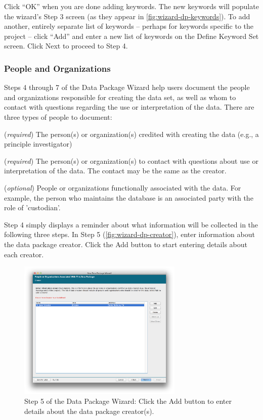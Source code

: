 Click ``OK'' when you are done adding keywords. The new keywords will
populate the wizard's Step 3 screen (as they appear in
\autoref{fig:wizard-dp-keywords}). To add another, entirely separate
list of keywords -- perhaps for keywords specific to the project --
click ``Add'' and enter a new list of keywords on the Define Keyword Set
screen. Click Next to proceed to Step 4.

\subsubsection{People and Organizations} \label{sec:wizard-dp-people}

Steps 4 through 7 of the Data Package Wizard help users document the
people and organizations responsible for creating the data set, as well
as whom to contact with questions regarding the use or interpretation of
the data. There are three types of people to document:
\begin{description}
  \setlength{\parskip}{1pt}
  \item [Creator] (\emph{required}) The person(s) or organization(s) credited with
    creating the data (e.g., a principle investigator)
  \item [Contact] (\emph{required}) The person(s) or organization(s) to contact
    with questions about use or interpretation of the data. The contact
    may be the same as the creator.
  \item [Associated parties] (\emph{optional}) People or organizations
    functionally associated with the data. For example, the person who
    maintains the database is an associated party with the role of
    'custodian'.
\end{description}

Step 4 simply displays a reminder about what information will be
collected in the following three steps. In Step 5
(\autoref{fig:wizard-dp-creator}), enter information about the data
package creator. Click the Add button to start entering details about each
creator.

\begin{figure}
  \centering
    \includegraphics[width=0.7\textwidth]{images/wizard-dp-creator.png}
  \caption{Step 5 of the Data Package Wizard: Click the Add button to
    enter details about the data package creator(s).}
  \label{fig:wizard-dp-creator}
\end{figure}


